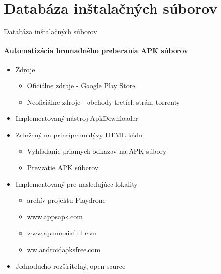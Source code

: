 \documentclass{beamer}
\begin{document}
\section{Databáza inštalačných súborov}
  \begin{frame}[label=lists]{Databáza inštalačných súborov}
    \framesubtitle{Automatizácia hromadného preberania APK súborov}
    
    \begin{itemize}
    \item Zdroje 
    \begin{itemize}
    	\item Oficiálne zdroje - Google Play Store
	    \item Neoficiálne zdroje - obchody tretích strán, torrenty
    	\end{itemize}  
  		\item Implementovaný nástroj ApkDownloader\cite{apkdownloader}
  		\item Založený na princípe analýzy HTML kódu
  		\begin{itemize}
  		\item Vyhľadanie priamych odkazov na APK súbory
  		\item Prevzatie APK súborov
  		\end{itemize}
		\item Implementovaný pre nasledujúce lokality
  		\begin{itemize}
  			\item archív projektu Playdrone
	  		\item www.appsapk.com
  			\item www.apkmaniafull.com
  			\item ww.androidapksfree.com
  		\end{itemize}
  		\item Jednoducho rozšíritelný, open source
    \end{itemize}  
  \end{frame}  
  
\end{document}
